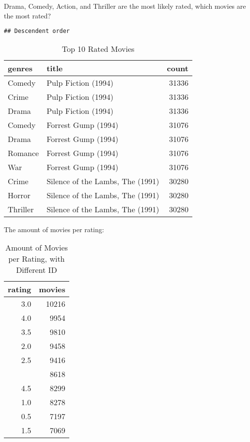 \documentclass[]{article}
\begin{document}
Drama, Comedy, Action, and Thriller are the most likely rated, which
movies are the most rated?

\begin{verbatim}
## Descendent order
\end{verbatim}

\begin{table}[!h]

\caption{\label{tab:movies.top.10}Top 10 Rated Movies}
\centering
\begin{tabular}{llr}
\toprule
genres & title & count\\
\midrule
\rowcolor{gray!6}  Comedy & Pulp Fiction (1994) & 31336\\
Crime & Pulp Fiction (1994) & 31336\\
\rowcolor{gray!6}  Drama & Pulp Fiction (1994) & 31336\\
Comedy & Forrest Gump (1994) & 31076\\
\rowcolor{gray!6}  Drama & Forrest Gump (1994) & 31076\\
\addlinespace
Romance & Forrest Gump (1994) & 31076\\
\rowcolor{gray!6}  War & Forrest Gump (1994) & 31076\\
Crime & Silence of the Lambs, The (1991) & 30280\\
\rowcolor{gray!6}  Horror & Silence of the Lambs, The (1991) & 30280\\
Thriller & Silence of the Lambs, The (1991) & 30280\\
\bottomrule
\end{tabular}
\end{table}

The amount of movies per rating:

\begin{table}[!h]

\caption{\label{tab:movies.per.rating}Amount of Movies per Rating, with Different ID}
\centering
\begin{tabular}{rr}
\toprule
rating & movies\\
\midrule
\rowcolor{gray!6}  3.0 & 10216\\
4.0 & 9954\\
\rowcolor{gray!6}  3.5 & 9810\\
2.0 & 9458\\
\rowcolor{gray!6}  2.5 & 9416\\
\addlinespace
5.0 & 8618\\
\rowcolor{gray!6}  4.5 & 8299\\
1.0 & 8278\\
\rowcolor{gray!6}  0.5 & 7197\\
1.5 & 7069\\
\bottomrule
\end{tabular}
\end{table}
\end{document}
